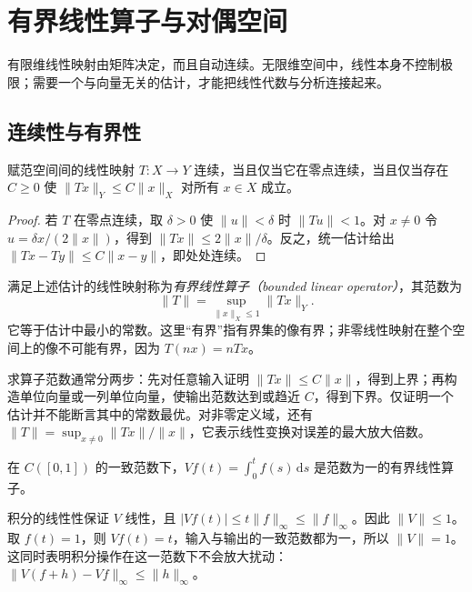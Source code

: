\setcounter{chapter}{3} %
\chapter{有界线性算子与对偶空间}
\label{chap:fa-operators}

有限维线性映射由矩阵决定，而且自动连续。无限维空间中，线性本身不控制极限；需要一个与向量无关的估计，才能把线性代数与分析连接起来。

\section{连续性与有界性}
\begin{theorem}\label{thm:fa-bounded-continuous}
赋范空间间的线性映射 $T:X\to Y$ 连续，当且仅当它在零点连续，当且仅当存在 $C\geq0$ 使 $\|Tx\|_Y\leq C\|x\|_X$ 对所有 $x\in X$ 成立。
\end{theorem}
\begin{proof}
若 $T$ 在零点连续，取 $\delta>0$ 使 $\|u\|<\delta$ 时 $\|Tu\|<1$。对 $x\ne0$ 令 $u=\delta x/(2\|x\|)$，得到 $\|Tx\|\leq2\|x\|/\delta$。反之，统一估计给出 $\|Tx-Ty\|\leq C\|x-y\|$，即处处连续。
\end{proof}
满足上述估计的线性映射称为\emph{有界线性算子（bounded linear operator）}，其范数为
\begin{equation}
 \|T\|=\sup_{\|x\|_X\leq1}\|Tx\|_Y.
 \label{eq:fa-operator-norm}
\end{equation}
它等于估计中最小的常数。这里“有界”指有界集的像有界；非零线性映射在整个空间上的像不可能有界，因为 $T(nx)=nTx$。

求算子范数通常分两步：先对任意输入证明 $\|Tx\|\leq C\|x\|$，得到上界；再构造单位向量或一列单位向量，使输出范数达到或趋近 $C$，得到下界。仅证明一个估计并不能断言其中的常数最优。对非零定义域，还有 $\|T\|=\sup_{x\ne0}\|Tx\|/\|x\|$，它表示线性变换对误差的最大放大倍数。

\begin{example}[积分算子的精确范数]\label{ex:fa-volterra-norm}
在 $C([0,1])$ 的一致范数下，$Vf(t)=\int_0^t f(s)\,\mathrm ds$ 是范数为一的有界线性算子。
\end{example}
\begin{solve}
积分的线性性保证 $V$ 线性，且 $|Vf(t)|\leq t\|f\|_\infty\leq\|f\|_\infty$。因此 $\|V\|\leq1$。取 $f(t)=1$，则 $Vf(t)=t$，输入与输出的一致范数都为一，所以 $\|V\|=1$。这同时表明积分操作在这一范数下不会放大扰动：$\|V(f+h)-Vf\|_\infty\leq\|h\|_\infty$。
\end{solve}

